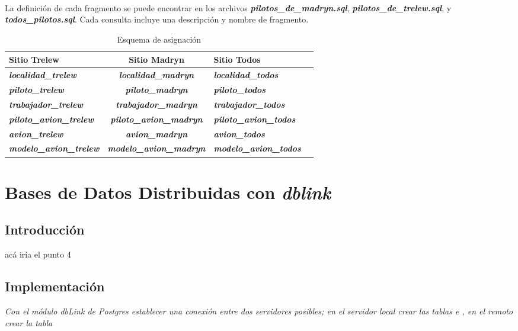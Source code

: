 ~\\

La definición de cada fragmento se puede encontrar en los archivos \textbf{\emph{pilotos\_de\_madryn.sql}}, \textbf{\emph{pilotos\_de\_trelew.sql}}, y \textbf{\emph{todos\_pilotos.sql}}. Cada consulta incluye una descripción y nombre de fragmento.

\begin{center}
    \begin{table}[H]
        \begin{tabular}{| p{5cm} | c | p{5cm} | p{4cm} |}
            \hline
            Sitio Trelew & Sitio Madryn & Sitio Todos\\ \hline
            \textbf{\emph{localidad\_trelew}} & \textbf{\emph{localidad\_madryn}} & \textbf{\emph{localidad\_todos}}\\ \hline
            \textbf{\emph{piloto\_trelew}} & \textbf{\emph{piloto\_madryn}} & \textbf{\emph{piloto\_todos}}\\ \hline
            \textbf{\emph{trabajador\_trelew}} & \textbf{\emph{trabajador\_madryn}} & \textbf{\emph{trabajador\_todos}}\\ \hline
            \textbf{\emph{piloto\_avion\_trelew}} & \textbf{\emph{piloto\_avion\_madryn}} & \textbf{\emph{piloto\_avion\_todos}}\\ \hline
            \textbf{\emph{avion\_trelew}} & \textbf{\emph{avion\_madryn}} & \textbf{\emph{avion\_todos}}\\ \hline
            \textbf{\emph{modelo\_avion\_trelew}} & \textbf{\emph{modelo\_avion\_madryn}} & \textbf{\emph{modelo\_avion\_todos}}\\ \hline
        \end{tabular}
    \caption{\label{tab:table-name}Esquema de asignación}
    \end{table}
\end{center}


\section{Bases de Datos Distribuidas con \emph{dblink}}

\subsection{Introducción}
acá iría el punto 4

\subsection{Implementación}
\emph{Con el módulo dbLink de Postgres establecer una conexión entre dos servidores posibles; en el servidor local crear las tablas  e , en el remoto crear la tabla } 

